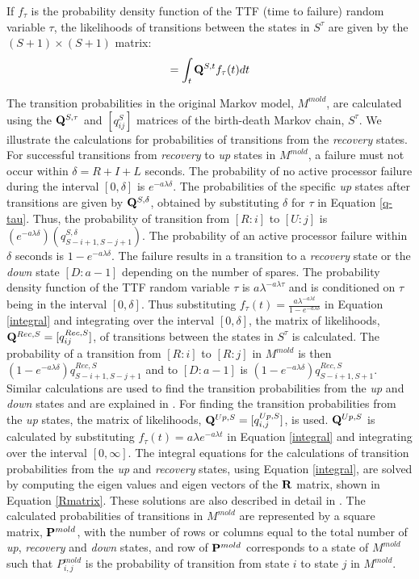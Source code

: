 \documentclass[conference,10pt]{IEEEtran}
\begin{document}
If $f_{\tau}$ is the probability density function of the TTF (time to
failure) random variable $\tau$, the likelihoods of transitions
between the states in $S^{\tau}$ are given by the $(S+1)\times (S+1)$
matrix:
\begin{equation} 
[q_{ij}^S] = \int_{t}{\bf Q}^{S,t}f_{\tau}(t)dt
\label{integral}
\end{equation} 

The transition probabilities in the original Markov model, $M^{mold}$,
are calculated using the ${\bf Q}^{S,\tau}$ and $[q_{ij}^S]$ matrices
of the birth-death Markov chain, $S^{\tau}$. We illustrate the
calculations for probabilities of transitions from the {\em recovery}
states. For successful transitions from {\em recovery} to {\em up}
states in $M^{mold}$, a failure must not occur within $\delta = R+I+L$
seconds. The probability of no active processor failure during the
interval $[0,\delta]$ is $e^{-a\lambda \delta}$. The probabilities of
the specific {\em up} states after transitions are given by ${\bf
  Q}^{S,\delta}$, obtained by substituting $\delta$ for $\tau$ in
Equation \ref{q-tau}. Thus, the probability of transition from $[R:i]$
to $[U:j]$ is $(e^{-a\lambda
  \delta})(q_{S-i+1,S-j+1}^{S,\delta})$. The probability of an active
processor failure within $\delta$ seconds is $1-e^{-a\lambda
  \delta}$. The failure results in a transition to a {\em recovery}
state or the {\em down} state $[D:a-1]$ depending on the number of
spares. The probability density function of the TTF random variable
$\tau$ is $a\lambda^{-a\lambda \tau}$ and is conditioned on $\tau$
being in the interval $[0,\delta]$. Thus substituting $f_{\tau}(t) =
\frac{a\lambda^{-a\lambda t}}{1-e^{-a\lambda \delta}}$ in Equation
\ref{integral} and integrating over the interval $[0,\delta]$, the
matrix of likelihoods, ${\bf Q}^{Rec,S}=[q_{ij}^{Rec,S}]$, of
transitions between the
states in $S^{\tau}$ is calculated. The probability of a transition
from $[R:i]$ to $[R:j]$ in $M^{mold}$ is then $(1-e^{-a\lambda
  \delta})q_{S-i+1,S-j+1}^{Rec,S}$ and to $[D:a-1]$ is
$(1-e^{-a\lambda \delta})q_{S-i+1,S+1}^{Rec,S}$. 
Similar calculations are used to find the transition probabilities
from the {\em up} and {\em down} states and are explained in
\cite{plank-processorallocation-jpdc01}. For finding the transition
probabilities from the {\em up} states, the matrix of likelihoods,
${\bf Q}^{Up,S}=[q_{i,j}^{Up,S}]$, is used. ${\bf Q}^{Up,S}$ is calculated by
substituting $f_{\tau}(t) = a\lambda e^{-a\lambda t}$ in Equation
\ref{integral} and integrating over the interval $[0,\infty]$.
The integral equations for
the calculations of transition probabilities from the {\em up} and
{\em recovery} states, using Equation \ref{integral}, are solved by
computing the
eigen values and eigen vectors of the ${\bf R}$ matrix, shown in
Equation \ref{Rmatrix}. These solutions are also described in detail
in \cite{plank-processorallocation-jpdc01}. The calculated
probabilities of transitions in $M^{mold}$ are represented by a square
matrix, ${\bf P}^{mold}$, with the number of rows or columns equal to
the total number of {\em up}, {\em recovery} and {\em down} states,
and row of ${\bf P}^{mold}$ corresponds to a state of $M^{mold}$ such
that $P_{i,j}^{mold}$ is the probability of transition from state $i$
to state $j$ in $M^{mold}$.
\end{document}
